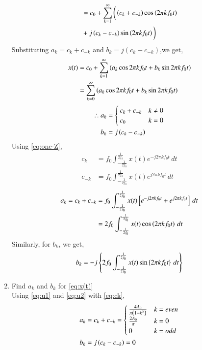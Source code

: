 \documentclass[journal,12pt,twocolumn]{IEEEtran}
\renewcommand\thesection{\arabic{section}}
\begin{document}
\begin{enumerate}[label=\thesection.\arabic*,ref=\thesection.\theenumi]
\begin{align}
    &=c_0+\sum_{k = 1}^{\infty}\bigg(\left(c_k+c_{-k}\right)\cos\left(2\pi kf_0 t\right)\\ &+j\left(c_k-c_{-k}\right)\sin\left(2\pi kf_0 t\right)\bigg)
    \end{align}
    Substituting $a_k=c_{k} + c_{-k}$ and $b_k=j(c_{k}-c_{-k})$,we get,
    \begin{align}
x(t)&=c_0+    \sum_{k = 1}^{\infty}\left(a_k\cos{2\pi kf_0 t}+b_k\sin{2\pi kf_0 t}\right)\\
&=\sum_{k = 0}^{\infty}\left(a_k\cos{2\pi kf_0 t}+b_k\sin{2\pi kf_0 t}\right)
    \end{align}
    \begin{align}
    \label{eq:u1}
    \therefore a_k&=
    \begin{cases}
    c_k+c_{-k}&k\neq0
    \\
    c_0&k=0
    \end{cases}\\
    \label{eq:u2}
    b_k&=j\left(c_k-c_{-k}\right)
    \end{align}
    Using \eqref{eq:one-Z},
    \begin{align}
    c_k &= f_0\int_{-\frac{1}{2f_0}}^{\frac{1}{2f_0}}x(t)e^{-j2\pi kf_0 t}\, dt\\
    c_{-k} &= f_0\int_{-\frac{1}{2f_0}}^{\frac{1}{2f_0}}x(t)e^{j2\pi kf_0 t}\, dt\end{align}
    \begin{align}
    a_k=c_k+c_{-k}&= f_0\int_{-\frac{1}{2f_0}}^{\frac{1}{2f_0}}x(t){}\left[e^{-j2\pi kf_0 t}+e^{j2\pi kf_0 t}\right]\, dt\\
    &=2f_0\int_{-\frac{1}{2f_0}}^{\frac{1}{2f_0}}x(t)\cos\left(2\pi kf_0t\right)\, dt
    \end{align}
    Similarly, for $b_k$, we get,
    \begin{align}
    b_k=-j\left\{2f_0\int_{-\frac{1}{2f_0}}^{\frac{1}{2f_0}}x(t)\sin\left\{2\pi kf_0t\right\}\, dt\right\}
    \end{align}
    \item Find $a_k$ and $b_k$ for 
        \eqref{eq:x(t)}\\
        \solution
        Using \eqref{eq:u1} and \eqref{eq:u2} with \eqref{eq:ck},
    \begin{align}
    a_k&=c_k+c_{-k}=\begin{cases}
\frac{4A_0}{\pi\brak{1-k^2}}&k=even
\\
\frac{2A_0}{\pi}&k=0
\\
0&k=odd
\end{cases}\\
b_k&=j\brak{c_k-c_{-k}}=0

\end{align}
\end{enumerate}
\end{document}
